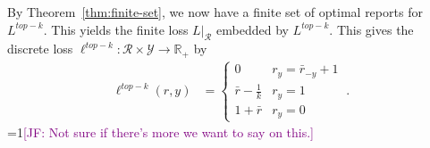 \documentclass[12pt]{article}
\newcommand{\Comments}{1}
\newcommand{\mynote}[2]{\ifnum\Comments=1\textcolor{#1}{#2}\fi}
\newcommand{\jessie}[1]{\mynote{purple}{[JF: #1]}}
\newcommand{\reals}{\mathbb{R}}
\newcommand{\prop}[1]{\Gamma[#1]}
\newcommand{\simplex}{\Delta_\Y}
\newcommand{\R}{\mathcal{R}}
\newcommand{\Y}{\mathcal{Y}}
\newtheorem{conjecture}{Conjecture}
\begin{document}
By Theorem~\ref{thm:finite-set}, we now have a finite set of optimal reports for $L^{top-k}$.
This yields the finite loss $L|_\R$ embedded by $L^{top-k}$.
This gives the discrete loss $\ell^{top-k} : \R \times\Y \to \reals_+$ by
\begin{align}
\ell^{top-k}(r,y) &= \begin{cases}
0 & r_y = \bar r_{-y} + 1\\
\bar r - \frac 1 k & r_y = 1\\
1 + \bar r & r_y = 0
\end{cases}~.~
\end{align}
\jessie{Not sure if there's more we want to say on this.}

\end{document}
